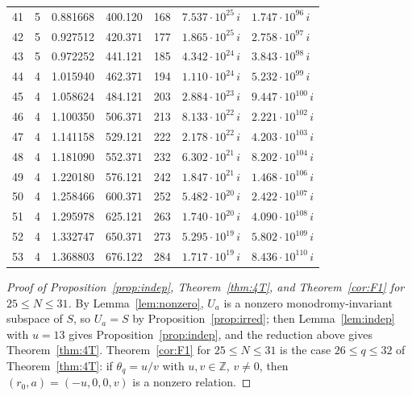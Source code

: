 \documentclass[11pt]{amsart}
\theoremstyle{definition}
\theoremstyle{remark}
\numberwithin{equation}{section}
\newcommand{\ZZ}{\mathbb{Z}}
\begin{document}
\begin{table}
\begin{tabular}{rrrrrll}
41 & 5 & 0.881668 & 400.120 & 168 & $7.537\cdot10^{25}\,i$ & $1.747\cdot10^{96}\,i$ \\
42 & 5 & 0.927512 & 420.371 & 177 & $1.865\cdot10^{25}\,i$ & $2.758\cdot10^{97}\,i$ \\
43 & 5 & 0.972252 & 441.121 & 185 & $4.342\cdot10^{24}\,i$ & $3.843\cdot10^{98}\,i$ \\
44 & 4 & 1.015940 & 462.371 & 194 & $1.110\cdot10^{24}\,i$ & $5.232\cdot10^{99}\,i$ \\
45 & 4 & 1.058624 & 484.121 & 203 & $2.884\cdot10^{23}\,i$ & $9.447\cdot10^{100}\,i$ \\
46 & 4 & 1.100350 & 506.371 & 213 & $8.133\cdot10^{22}\,i$ & $2.221\cdot10^{102}\,i$ \\
47 & 4 & 1.141158 & 529.121 & 222 & $2.178\cdot10^{22}\,i$ & $4.203\cdot10^{103}\,i$ \\
48 & 4 & 1.181090 & 552.371 & 232 & $6.302\cdot10^{21}\,i$ & $8.202\cdot10^{104}\,i$ \\
49 & 4 & 1.220180 & 576.121 & 242 & $1.847\cdot10^{21}\,i$ & $1.468\cdot10^{106}\,i$ \\
50 & 4 & 1.258466 & 600.371 & 252 & $5.482\cdot10^{20}\,i$ & $2.422\cdot10^{107}\,i$ \\
51 & 4 & 1.295978 & 625.121 & 263 & $1.740\cdot10^{20}\,i$ & $4.090\cdot10^{108}\,i$ \\
52 & 4 & 1.332747 & 650.371 & 273 & $5.295\cdot10^{19}\,i$ & $5.802\cdot10^{109}\,i$ \\
53 & 4 & 1.368803 & 676.122 & 284 & $1.717\cdot10^{19}\,i$ & $8.436\cdot10^{110}\,i$ \\
\bottomrule
\end{tabular}
\end{table}

\begin{proof}[Proof of Proposition~\ref{prop:indep}, Theorem~\ref{thm:4T}, and Theorem~\ref{cor:F1} for $25\le N\le31$]
By Lemma~\ref{lem:nonzero}, $U_a$ is a nonzero monodromy-invariant subspace of $S$, so $U_a=S$ by
Proposition~\ref{prop:irred}; then Lemma~\ref{lem:indep} with $u=13$ gives Proposition~\ref{prop:indep}, and the
reduction above gives Theorem~\ref{thm:4T}. Theorem~\ref{cor:F1} for $25\le N\le31$ is the case $26\le q\le32$ of
Theorem~\ref{thm:4T}:
if $\theta_q=u/v$ with $u,v\in\ZZ$, $v\ne0$, then $(r_0,a)=(-u,0,0,v)$ is a nonzero relation.
\end{proof}
\end{document}
